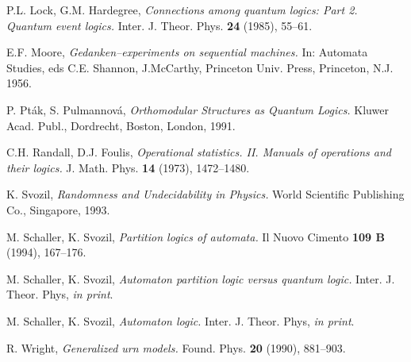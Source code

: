 \begin{thebibliography}{plain}
 P.L. Lock, G.M. Hardegree, {\it Connections among quantum
logics: Part 2.
Quantum event logics.} Inter. J. Theor. Phys. {\bf 24} (1985), 55--61.

 E.F. Moore, {\it Gedanken--experiments on
sequential machines.} In: Automata Studies, eds C.E. Shannon, J.McCarthy,
Princeton Univ. Press, Princeton, N.J. 1956.

 P. Pt\'ak, S. Pulmannov\'a, {\it %
Orthomodular Structures
as Quantum Logics.} Kluwer Acad. Publ., Dordrecht, Boston,
London, 1991.

 C.H. Randall, D.J. Foulis, {\it Operational statistics.
II. Manuals of operations and their logics.} J. Math. Phys.
{\bf 14}
(1973), 1472--1480.

 K. Svozil, {\it Randomness and Undecidability in Physics.}
World Scientific Publishing Co., Singapore, 1993.

 M. Schaller, K. Svozil, {\it Partition logics of
automata.} Il Nuovo Cimento {\bf 109 B} (1994), 167--176.

 M. Schaller, K. Svozil,
{\it Automaton partition logic versus quantum logic.}
 Inter. J. Theor. Phys, {\it in print}.

 M. Schaller, K. Svozil,
{\it Automaton logic.}
 Inter. J. Theor. Phys, {\it in print}.


 R. Wright,  {\it Generalized urn models.} Found. Phys.
{\bf 20} (1990), 881--903.



\end{thebibliography}

